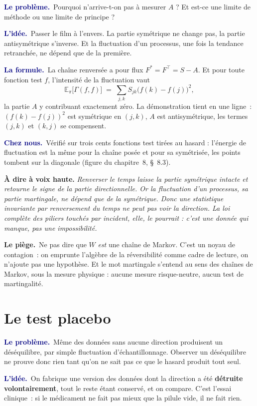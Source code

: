 \documentclass[11pt,a4paper]{article}
\newcommand{\lequoi}[1]{\smallskip\noindent\textcolor{navy}{\textbf{Le problème.}}\ #1\par}
\newcommand{\lidee}[1]{\smallskip\noindent\textcolor{navy}{\textbf{L'idée.}}\ #1\par}
\newcommand{\laformule}[1]{\smallskip\noindent\textcolor{navy}{\textbf{La formule.}}\ #1\par}
\newcommand{\cheznous}[1]{\smallskip\noindent\textcolor{navy}{\textbf{Chez nous.}}\ #1\par}
\newcommand{\lepiege}[1]{\smallskip\noindent\textcolor{accent}{\textbf{Le piège.}}\ #1\par}
\newcommand{\laphrase}[1]{\begin{phrasebox}\textbf{À dire à voix haute.} \emph{#1}\end{phrasebox}}
\begin{document}
\lequoi{Pourquoi n'arrive-t-on pas à mesurer $A$ ? Et est-ce une limite de méthode ou une
limite de principe ?}

\lidee{Passer le film à l'envers. La partie symétrique ne change pas, la partie
antisymétrique s'inverse. Et la fluctuation d'un processus, une fois la tendance retranchée,
ne dépend que de la première.}

\laformule{La chaîne renversée a pour flux $F^{*}=F^{\top}=S-A$. Et pour toute fonction test
$f$, l'intensité de la fluctuation vaut
\[
  \mathbb{E}_\pi\bigl[\Gamma(f,f)\bigr]
  \;=\;\sum_{j,k} S_{jk}\bigl(f(k)-f(j)\bigr)^2 ,
\]
la partie $A$ y contribuant exactement zéro. La démonstration tient en une ligne~:
$(f(k)-f(j))^2$ est symétrique en $(j,k)$, $A$ est antisymétrique, les termes $(j,k)$ et
$(k,j)$ se compensent.}

\cheznous{Vérifié sur trois cents fonctions test tirées au hasard : l'énergie de fluctuation est
la même pour la chaîne posée et pour sa symétrisée, les points tombent sur la diagonale (figure du
chapitre~8, \S~8.3).}

\laphrase{Renverser le temps laisse la partie symétrique intacte et retourne le signe de la partie
directionnelle. Or la fluctuation d'un processus, sa partie martingale, ne dépend que de la
symétrique. Donc une statistique invariante par renversement du temps ne peut pas voir la
direction. La loi complète des piliers touchés par incident, elle, le pourrait : c'est une donnée
qui manque, pas une impossibilité.}

\lepiege{Ne pas dire que $W$ \emph{est} une chaîne de Markov. C'est un noyau de contagion~: on
emprunte l'algèbre de la réversibilité comme cadre de lecture, on n'ajoute pas une hypothèse. Et le
mot martingale s'entend au sens des chaînes de Markov, sous la mesure physique : aucune mesure
risque-neutre, aucun test de martingalité.}

\section{Le test placebo}
\label{sec:placebo}

\lequoi{Même des données sans aucune direction produisent un déséquilibre, par simple
fluctuation d'échantillonnage. Observer un déséquilibre ne prouve donc rien tant qu'on ne
sait pas ce que le hasard produit tout seul.}

\lidee{On fabrique une version des données dont la direction a été \textbf{détruite
volontairement}, tout le reste étant conservé, et on compare. C'est l'essai clinique~: si le
médicament ne fait pas mieux que la pilule vide, il ne fait rien.}
\end{document}
